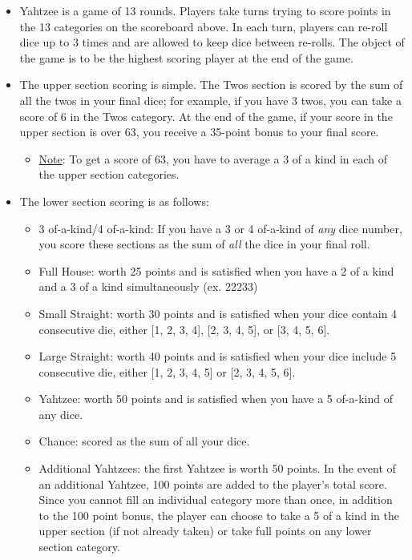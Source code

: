 \documentclass[12pt,a4paper]{article}
\begin{document}
\begin{itemize}
    \item Yahtzee is a game of 13 rounds. Players take turns trying to score points in the 13 categories on the scoreboard above. In each turn, players can re-roll dice up to 3 times and are allowed to keep dice between re-rolls. The object of the game is to be the highest scoring player at the end of the game.
    \item The upper section scoring is simple. The Twos section is scored by the sum of all the twos in your final dice; for example, if you have 3 twos, you can take a score of 6 in the Twos category. At the end of the game, if your score in the upper section is over 63, you receive a 35-point bonus to your final score.
    \begin{itemize}
        \item \underline{Note}: To get a score of 63, you have to average a 3 of a kind in each of the upper section categories.
    \end{itemize}
    \item The lower section scoring is as follows:
    \begin{itemize}
        \item 3 of-a-kind/4 of-a-kind: If you have a 3 or 4 of-a-kind of \textit{any} dice number, you score these sections as the sum of \textit{all} the dice in your final roll.
        \item Full House: worth 25 points and is satisfied when you have a 2 of a kind and a 3 of a kind simultaneously (ex. 22233)
        \item Small Straight: worth 30 points and is satisfied when your dice contain 4 consecutive die, either [1, 2, 3, 4], [2, 3, 4, 5], or [3, 4, 5, 6].
        \item Large Straight: worth 40 points and is satisfied when your dice include 5 consecutive die, either [1, 2, 3, 4, 5] or [2, 3, 4, 5, 6].
        \item Yahtzee: worth 50 points and is satisfied when you have a 5 of-a-kind of any dice.
        \item Chance: scored as the sum of all your dice.
        \item Additional Yahtzees: the first Yahtzee is worth 50 points. In the event of an additional Yahtzee, 100 points are added to the player's total score. Since you cannot fill an individual category more than once, in addition to the 100 point bonus, the player can choose to take a 5 of a kind in the upper section (if not already taken) or take full points on any lower section category.
    \end{itemize}
\end{itemize}
\end{document}
